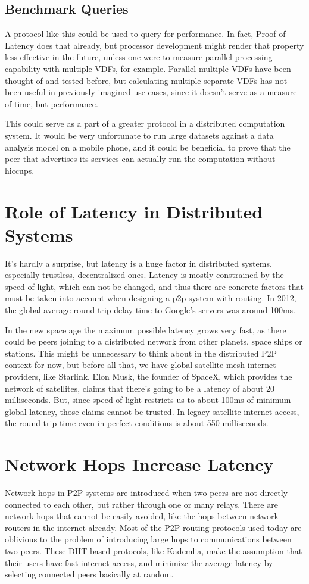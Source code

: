 \subsection{Benchmark Queries}
A protocol like this could be used to query for performance. In fact, Proof of Latency does that already, but processor development might render that property less effective in the future, unless one were to measure parallel processing capability with multiple VDFs, for example. Parallel multiple VDFs have been thought of and tested before, but calculating multiple separate VDFs has not been useful in previously imagined use cases, since it doesn't serve as a measure of time, but performance.

This could serve as a part of a greater protocol in a distributed computation system. It would be very unfortunate to run large datasets against a data analysis model on a mobile phone, and it could be beneficial to prove that the peer that advertises its services can actually run the computation without hiccups.

\section{Role of Latency in Distributed Systems}
It's hardly a surprise, but latency is a huge factor in distributed systems, especially trustless, decentralized ones. Latency is mostly constrained by the speed of light, which can not be changed, and thus there are concrete factors that must be taken into account when designing a p2p system with routing. In 2012, the global average round-trip delay time to Google's servers was around 100ms.\cite{Grigorik_undated-mc}

In the new space age the maximum possible latency grows very fast, as there could be peers joining to a distributed network from other planets, space ships or stations. This might be unnecessary to think about in the distributed P2P context for now, but before all that, we have global satellite mesh internet providers, like Starlink. Elon Musk, the founder of SpaceX, which provides the network of satellites, claims that there's going to be a latency of about 20 milliseconds.\cite{Tung_undated-ny} But, since speed of light restricts us to about 100ms of minimum global latency, those claims cannot be trusted. In legacy satellite internet access, the round-trip time even in perfect conditions is about 550 milliseconds.\cite{noauthor_undated-zc}

\section{Network Hops Increase Latency}
Network hops in P2P systems are introduced when two peers are not directly connected to each other, but rather through one or many relays. There are network hops that cannot be easily avoided, like the hops between network routers in the internet already. Most of the P2P routing protocols used today are oblivious to the problem of introducing large hops to communications between two peers. These DHT-based protocols, like Kademlia, make the assumption that their users have fast internet access, and minimize the average latency by selecting connected peers basically at random.

